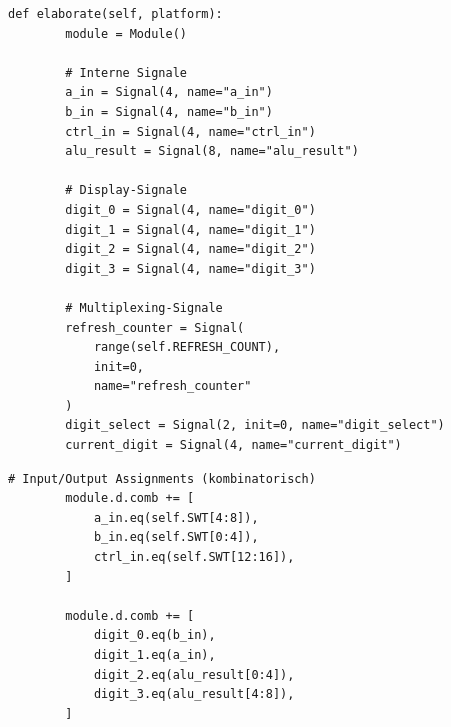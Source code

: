﻿\documentclass[12pt,a4paper]{report}
\begin{document}
\begin{lstlisting}[style=pythonstyle, caption={Amaranth ALU-Implementation - Teil 2: elaborate()}]
    def elaborate(self, platform):
        module = Module()
        
        # Interne Signale
        a_in = Signal(4, name="a_in")
        b_in = Signal(4, name="b_in")
        ctrl_in = Signal(4, name="ctrl_in")
        alu_result = Signal(8, name="alu_result")
        
        # Display-Signale
        digit_0 = Signal(4, name="digit_0")
        digit_1 = Signal(4, name="digit_1")
        digit_2 = Signal(4, name="digit_2")
        digit_3 = Signal(4, name="digit_3")
        
        # Multiplexing-Signale
        refresh_counter = Signal(
            range(self.REFRESH_COUNT), 
            init=0, 
            name="refresh_counter"
        )
        digit_select = Signal(2, init=0, name="digit_select")
        current_digit = Signal(4, name="current_digit")
\end{lstlisting}

\begin{lstlisting}[style=pythonstyle, caption={Amaranth ALU-Implementation - Teil 3: I/O Mapping}]
        # Input/Output Assignments (kombinatorisch)
        module.d.comb += [
            a_in.eq(self.SWT[4:8]),
            b_in.eq(self.SWT[0:4]),
            ctrl_in.eq(self.SWT[12:16]),
        ]
        
        module.d.comb += [
            digit_0.eq(b_in),
            digit_1.eq(a_in),
            digit_2.eq(alu_result[0:4]),
            digit_3.eq(alu_result[4:8]),
        ]
\end{lstlisting}
\end{document}

